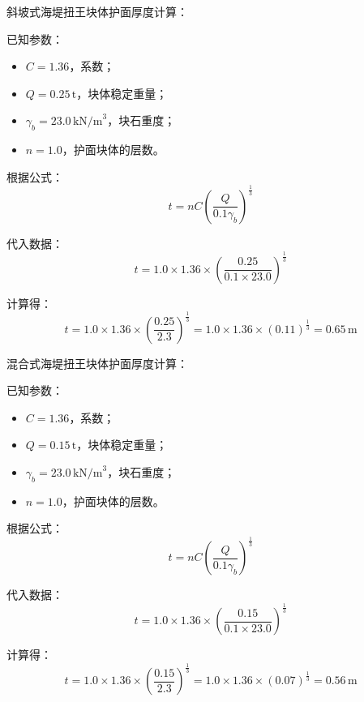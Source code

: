 \documentclass[UTF8, a4paper, 12pt]{ctexart} %
\begin{document}
\par

斜坡式海堤扭王块体护面厚度计算：


已知参数：
\begin{itemize}
    \item $C = 1.36$，系数；
    \item $Q = 0.25\,\text{t}$，块体稳定重量；
    \item $\gamma_b = 23.0\,\text{kN/m}^3$，块石重度；
    \item $n = 1.0$，护面块体的层数。
\end{itemize}

根据公式：
\begin{equation}
    t = nC \left( \frac{Q}{0.1 \gamma_b} \right)^{\frac{1}{3}}
\end{equation}

代入数据：
\begin{equation}
    t = 1.0 \times 1.36 \times \left( \frac{0.25}{0.1 \times 23.0} \right)^{\frac{1}{3}}
\end{equation}

计算得：
\begin{equation}
    t = 1.0 \times 1.36 \times \left( \frac{0.25}{2.3} \right)^{\frac{1}{3}} = 1.0 \times 1.36 \times (0.11)^{\frac{1}{3}} = 0.65\,\text{m}
\end{equation}


混合式海堤扭王块体护面厚度计算：



已知参数：
\begin{itemize}
    \item $C = 1.36$，系数；
    \item $Q = 0.15\,\text{t}$，块体稳定重量；
    \item $\gamma_b = 23.0\,\text{kN/m}^3$，块石重度；
    \item $n = 1.0$，护面块体的层数。
\end{itemize}

根据公式：
\begin{equation}
    t = nC \left( \frac{Q}{0.1 \gamma_b} \right)^{\frac{1}{3}}
\end{equation}

代入数据：
\begin{equation}
    t = 1.0 \times 1.36 \times \left( \frac{0.15}{0.1 \times 23.0} \right)^{\frac{1}{3}}
\end{equation}

计算得：
\begin{equation}
    t = 1.0 \times 1.36 \times \left( \frac{0.15}{2.3} \right)^{\frac{1}{3}} = 1.0 \times 1.36 \times (0.07)^{\frac{1}{3}} = 0.56\,\text{m}
\end{equation}
\end{document}
